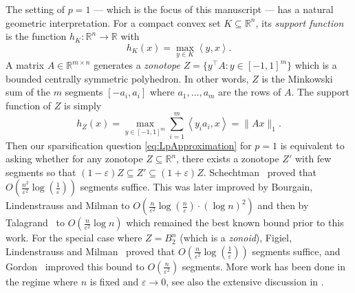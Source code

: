 \documentclass[12pt,english]{article}
\theoremstyle{theorem}
\theoremstyle{remark}
\def\rem#1{{\marginpar{\raggedright\scriptsize #1}}}
\providecommand{\setR}{\mathbb{R}}
\newcommand{\eps}{\varepsilon}
\begin{document}
The setting of $p=1$ --- which is the focus of this manuscript --- has a natural geometric interpretation. For a compact convex set $K \subseteq \setR^n$, its \emph{support function} is the function $h_K : \setR^n \to \setR$ with
\[
  h_K(x) = \max_{y \in K} \left<y,x\right>.
\]
A matrix $A \in \setR^{m \times n}$ generates a \emph{zonotope} $Z = \{ y^\top A : y \in [-1,1]^m \}$ which is a bounded centrally symmetric polyhedron. In other words, $Z$ is the Minkowski sum of the $m$ segments $[-a_i,a_i]$
where $a_1,\ldots,a_m$ are the rows of $A$.
The support function of $Z$ is simply
\[
 h_Z(x) = \max_{y \in [-1,1]^m} \sum_{i=1}^m \left<y_ia_i,x\right> = \|Ax\|_1.
\]
Then our sparsification question \eqref{eq:LpApproximation} for $p = 1$ is equivalent to asking whether for any zonotope $Z \subseteq \setR^n$, there exists a zonotope $Z'$ with few segments so that $(1-\varepsilon) Z \subseteq Z' \subseteq (1+\varepsilon)Z$. Schechtman~\cite{Schechtman1987} proved that $O(\frac{n^2}{\varepsilon^2} \log(\frac{1}{\varepsilon}))$ segments suffice. This was later improved by Bourgain, Lindenstrauss and Milman \cite{BourgainLindenstraussMilman1989} to $O(\frac{n}{\varepsilon^2} \log(\frac{n}{\varepsilon}) \cdot (\log n)^2)$
and then by Talagrand~\cite{Talagrand1990} to $O(\frac{n}{\varepsilon^2} \log n)$ which remained the best known bound prior to this work. For the special case where $Z = B^n_2$ (which is a \textit{zonoid}), Figiel, Lindenstrauss and Milman~\cite{FigielLindenstraussMilman1977} proved that $O(\frac{n}{\varepsilon^2} \log(\tfrac{1}{\eps}))$ segments suffice, and Gordon~\cite{Gordon1985} improved this bound to $O(\frac{n}{\varepsilon^2})$ segments. More work has been done in the regime where $n$ is fixed and $\varepsilon \to 0$, see also the extensive discussion in \cite{BourgainLindenstraussMilman1989}.
\end{document}
